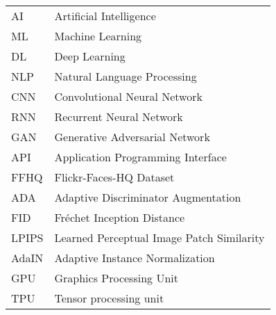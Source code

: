\begin{tabular}{l l}
AI & Artificial Intelligence \\
ML & Machine Learning \\
DL & Deep Learning \\
NLP & Natural Language Processing \\
CNN & Convolutional Neural Network \\
RNN & Recurrent Neural Network \\
GAN & Generative Adversarial Network \\
API & Application Programming Interface \\
FFHQ & Flickr-Faces-HQ Dataset \\
ADA & Adaptive Discriminator Augmentation \\
FID & Fréchet Inception Distance \\
LPIPS & Learned Perceptual Image Patch Similarity \\
AdaIN & Adaptive Instance Normalization \\
GPU & Graphics Processing Unit \\
TPU & Tensor processing unit
\end{tabular}